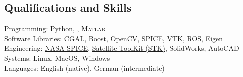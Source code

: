 \subsection*{Qualifications and Skills}
{}

Programming: Python, \CC, \textsc{Matlab} \\
Software Libraries: \href{https://www.cgal.org/}{CGAL}, \href{https://www.boost.org/}{Boost}, \href{https:://opencv.org/}{OpenCV}, \href{https://naif.jpl.nasa.gov/naif/toolkit.html}{SPICE}, \href{https://www.vtk.org}{VTK}, \href{http://www.ros.org}{ROS}, \href{https://eigen.tuxfamily.org/index.php?title=Main_Page}{Eigen} \\
Engineering: \href{https://naif.jpl.nasa.gov/naif/toolkit.html}{NASA SPICE}, \href{http://www.agi.com/products/engineering-tools}{Satellite ToolKit (STK)}, SolidWorks, AutoCAD \\
Systems: Linux, MacOS, Windows \\
Languages: English (native), German (intermediate)
